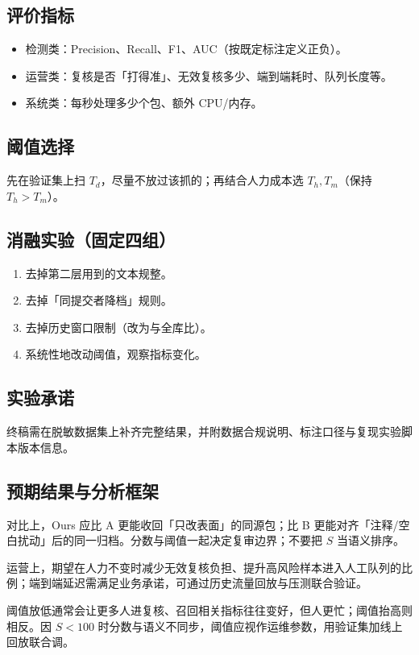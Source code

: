 \documentclass[UTF8,a4paper,zihao=5]{ctexart}
\begin{document}
\subsection{评价指标}
\begin{itemize}[leftmargin=2em]
  \item 检测类：Precision、Recall、F1、AUC（按既定标注定义正负）。
  \item 运营类：复核是否「打得准」、无效复核多少、端到端耗时、队列长度等。
  \item 系统类：每秒处理多少个包、额外 CPU/内存。
\end{itemize}

\subsection{阈值选择}
先在验证集上扫 $T_d$，尽量不放过该抓的；再结合人力成本选 $T_h,T_m$（保持 $T_h>T_m$）。

\subsection{消融实验（固定四组）}
\begin{enumerate}[leftmargin=2em]
  \item 去掉第二层用到的文本规整。
  \item 去掉「同提交者降档」规则。
  \item 去掉历史窗口限制（改为与全库比）。
  \item 系统性地改动阈值，观察指标变化。
\end{enumerate}

\subsection{实验承诺}
终稿需在脱敏数据集上补齐完整结果，并附数据合规说明、标注口径与复现实验脚本版本信息。

\subsection{预期结果与分析框架}
对比上，Ours 应比 A 更能收回「只改表面」的同源包；比 B 更能对齐「注释/空白扰动」后的同一归档。分数与阈值一起决定复审边界；不要把 $S$ 当语义排序。

运营上，期望在人力不变时减少无效复核负担、提升高风险样本进入人工队列的比例；端到端延迟需满足业务承诺，可通过历史流量回放与压测联合验证。

阈值放低通常会让更多人进复核、召回相关指标往往变好，但人更忙；阈值抬高则相反。因 $S<100$ 时分数与语义不同步，阈值应视作运维参数，用验证集加线上回放联合调。
\end{document}
